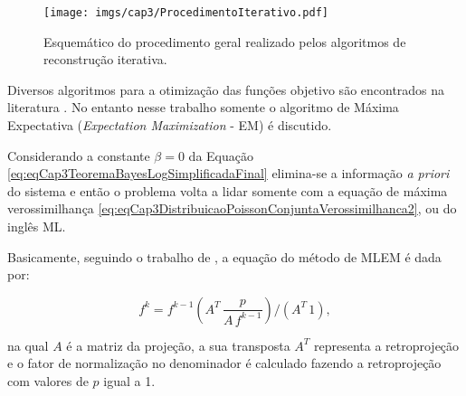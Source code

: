 {{\begin{figure}[H]
	\caption{Esquemático do procedimento geral realizado pelos algoritmos de reconstrução iterativa.}
	\begin{center}
		\texttt{[image: imgs/cap3/ProcedimentoIterativo.pdf]}
	\end{center}
	\label{fig:imgCap3ProcedimentoIterativo}
\end{figure}

Diversos algoritmos para a otimização das funções objetivo são encontrados na literatura \cite{Fessler2000handbook,das2011penalized,zeng2010medical,sidky2014iterative,xu2015statistical,zheng2018detector}. No entanto nesse trabalho somente o algoritmo de Máxima Expectativa (\textit{Expectation Maximization} - \acs{EM}) é discutido.

Considerando a constante $\beta = 0$ da Equação \ref{eq:eqCap3TeoremaBayesLogSimplificadaFinal} elimina-se a informação \textit{a priori} do sistema e então o problema volta a lidar somente com a equação de máxima verossimilhança \eqref{eq:eqCap3DistribuicaoPoissonConjuntaVerossimilhanca2}, ou do inglês \acs{ML}.  

Basicamente, seguindo o trabalho de , a equação do método de \acs{MLEM} é dada por:

\begin{equation}
f^{k} = f^{k-1}  \left(A^{T} \, \dfrac{p}{A \, f^{k-1}}\right)   /    (A^{T}\,1),
\label{eq:eqCap3MLEM}
\end{equation}

\noindent na qual $A$ é a matriz da projeção, a sua transposta $A^{T}$ representa a retroprojeção e o fator de normalização no denominador é calculado fazendo a retroprojeção com valores de $p$ igual a 1.

%
%
%
%

}}
